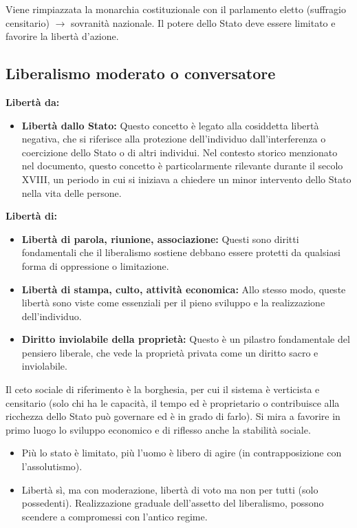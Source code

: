 \documentclass[a4paper]{article}
\begin{document}
Viene rimpiazzata la monarchia costituzionale con il parlamento eletto (suffragio censitario)
\(\rightarrow\) sovranità nazionale.
Il potere dello Stato deve essere limitato e favorire la libertà d'azione.

\subsection{Liberalismo moderato o conversatore}

\textbf{Libertà da:}
\begin{itemize}
    \item \textbf{Libertà dallo Stato:} Questo concetto è legato alla cosiddetta libertà negativa, che si riferisce alla protezione dell'individuo
        dall'interferenza o coercizione dello Stato o di altri individui.
        Nel contesto storico menzionato nel documento, questo concetto è particolarmente
        rilevante durante il secolo XVIII, un periodo in cui si iniziava
        a chiedere un minor intervento dello Stato nella vita delle persone.
\end{itemize}

\textbf{Libertà di:}
\begin{itemize}
    \item \textbf{Libertà di parola, riunione, associazione:} Questi sono diritti fondamentali che il liberalismo sostiene debbano essere protetti da qualsiasi forma di oppressione o limitazione.
    \item \textbf{Libertà di stampa, culto, attività economica:} Allo stesso modo, queste libertà sono viste come essenziali per il pieno sviluppo e la realizzazione dell'individuo.
    \item \textbf{Diritto inviolabile della proprietà:} Questo è un pilastro fondamentale del pensiero liberale, che vede la proprietà privata come un diritto sacro e inviolabile.
\end{itemize}

Il ceto sociale di riferimento è la borghesia, per cui il sistema è verticista e censitario (solo chi
ha le capacità, il tempo ed è proprietario o contribuisce alla ricchezza dello Stato può governare
ed è in grado di farlo).
Si mira a favorire in primo luogo lo sviluppo economico e di riflesso anche la stabilità sociale.

\begin{itemize}
    \item Più lo stato è limitato, più l'uomo è libero di agire (in contrapposizione con l'assolutismo).
    \item Libertà sì, ma con moderazione, libertà di voto ma non per tutti (solo possedenti). Realizzazione graduale dell'assetto del liberalismo, possono scendere a compromessi con l'antico regime.
\end{itemize}
\end{document}
